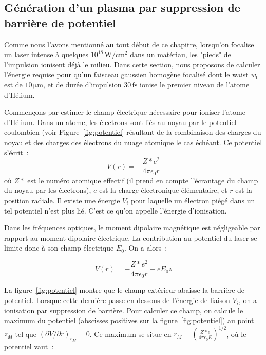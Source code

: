 \documentclass[a4paper]{book}
\begin{document}
\subsection{Génération d'un plasma par suppression de barrière de potentiel}

Comme nous l'avons mentionné au tout début de ce chapitre, lorsqu'on focalise un laser intense à quelques $10^{18}\,\mathrm{W/cm^2}$ dans un matériau, les "pieds" de l'impulsion ionisent déjà le milieu. Dans cette section, nous proposons de calculer l'énergie requise pour qu'un faisceau gaussien homogène focalisé dont le waist $w_0$ est de $10\,\mathrm{\mu m}$, et de durée d'impulsion $30\,\mathrm{fs}$ ionise le premier niveau de l'atome d'Hélium. 

Commençons par estimer le champ électrique nécessaire pour ioniser l'atome d'Hélium. Dans un atome, les électrons sont liés au noyau par le potentiel coulombien (voir Figure~\ref{fig:potentiel} résultant de la combinaison des charges du noyau et des charges des électrons du nuage atomique le cas échéant. Ce potentiel s'écrit~:
\begin{equation}
    V(r)=-\frac{Z*e^2}{4\pi\epsilon_0r}
\end{equation}
où $Z*$ est le numéro atomique effectif (il prend en compte l'écrantage du champ du noyau par les électrons), $e$ est la charge électronique élémentaire, et $r$ est la position radiale. Il existe une énergie $V_i$ pour laquelle un électron piégé dans un tel potentiel n'est plus lié. C'est ce qu'on appelle l'énergie d'ionisation. 

Dans les fréquences optiques, le moment dipolaire magnétique est négligeable par rapport au moment dipolaire électrique. La contribution au potentiel du laser se limite donc à son champ électrique $E_0$. On a alors~:

\begin{equation}
    V(r)=-\frac{Z*e^2}{4\pi\epsilon_0r}-eE_0z
\end{equation}

La figure~\ref{fig:potentiel} montre que le champ extérieur abaisse la barrière de potentiel. Lorsque cette dernière passe en-dessous de l'énergie de liaison $V_i$, on a ionisation par suppression de barrière. Pour calculer ce champ, on calcule le maximum du potentiel (abscisses positives sur la figure~\ref{fig:potentiel}) au point $z_M$ tel que $\left(\partial V/\partial r\right)_{r_M}=0$. Ce maximum se situe en $r_M=\left(\frac{Z*e}{4\pi\epsilon_0E}\right)^{1/2}$, où le potentiel vaut~:
\end{document}

